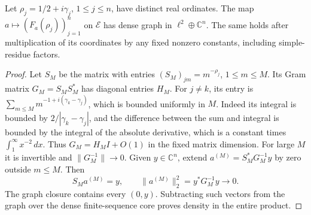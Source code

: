 \begin{proposition}
\label{v4-arith:mo:finite-occupation-graph}
Let $\rho_j=1/2+i\gamma_j$, $1\leq j\leq n$, have distinct
real ordinates. The map
$a\mapsto(F_a(\rho_j))_{j=1}^n$ on $\mathscr E$ has dense graph
in $\ell^2\oplus\mathbb C^n$. The same holds after multiplication
of its coordinates by any fixed nonzero constants, including
simple-residue factors.
\end{proposition}
\begin{proof}
Let $S_M$ be the matrix with entries $(S_M)_{jm}=m^{-\rho_j}$,
$1\leq m\leq M$. Its Gram matrix $G_M=S_MS_M^*$ has diagonal
entries $H_M$. For $j\ne k$, its entry is
$\sum_{m\leq M}m^{-1+i(\gamma_k-\gamma_j)}$, which is bounded
uniformly in $M$. Indeed its integral is bounded by
$2/|\gamma_k-\gamma_j|$, and the difference between the sum and
integral is bounded by the integral of the absolute derivative,
which is a constant times $\int_1^\infty x^{-2}\,dx$.
Thus $G_M=H_MI+O(1)$ in the fixed matrix dimension. For large $M$
it is invertible and $\|G_M^{-1}\|\to0$.
Given $y\in\mathbb C^n$, extend
$a^{(M)}=S_M^*G_M^{-1}y$ by zero outside $m\leq M$. Then
\[
 S_Ma^{(M)}=y,\qquad
 \|a^{(M)}\|_2^2=y^*G_M^{-1}y\longrightarrow0.
\]
The graph closure contains every $(0,y)$. Subtracting such
vectors from the graph over the dense finite-sequence core proves
density in the entire product.
\end{proof}

